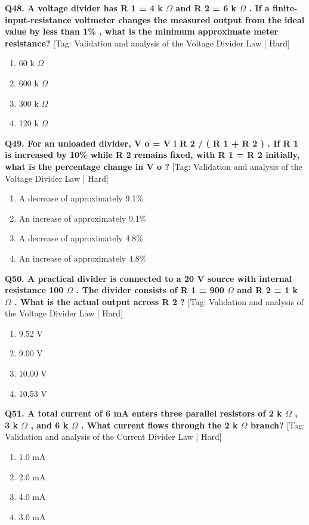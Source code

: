 \noindent\textbf{Q48. A voltage divider has R 1 = 4 k $\Omega$ and R 2 = 6 k $\Omega$ . If a finite-input-resistance voltmeter changes the measured output from the ideal value by less than 1\% , what is the minimum approximate meter resistance?} \hfill [Tag: Validation and analysis of the Voltage Divider Law | Hard]
\begin{enumerate}[label=(\alph*),topsep=2pt,itemsep=1pt,partopsep=0pt,parsep=0pt]
    \item {60 k $\Omega$}
    \item {600 k $\Omega$}
    \item {300 k $\Omega$}
    \item {120 k $\Omega$}
\end{enumerate}
\vspace{2mm}

\noindent\textbf{Q49. For an unloaded divider, V o = V i R 2 / ( R 1 + R 2 ) . If R 1 is increased by 10\% while R 2 remains fixed, with R 1 = R 2 initially, what is the percentage change in V o ?} \hfill [Tag: Validation and analysis of the Voltage Divider Law | Hard]
\begin{enumerate}[label=(\alph*),topsep=2pt,itemsep=1pt,partopsep=0pt,parsep=0pt]
    \item {A decrease of approximately 9.1\%}
    \item {An increase of approximately 9.1\%}
    \item {A decrease of approximately 4.8\%}
    \item {An increase of approximately 4.8\%}
\end{enumerate}
\vspace{2mm}

\noindent\textbf{Q50. A practical divider is connected to a 20 V source with internal resistance 100 $\Omega$ . The divider consists of R 1 = 900 $\Omega$ and R 2 = 1 k $\Omega$ . What is the actual output across R 2 ?} \hfill [Tag: Validation and analysis of the Voltage Divider Law | Hard]
\begin{enumerate}[label=(\alph*),topsep=2pt,itemsep=1pt,partopsep=0pt,parsep=0pt]
    \item {9.52 V}
    \item {9.00 V}
    \item {10.00 V}
    \item {10.53 V}
\end{enumerate}
\vspace{2mm}

\noindent\textbf{Q51. A total current of 6 mA enters three parallel resistors of 2 k $\Omega$ , 3 k $\Omega$ , and 6 k $\Omega$ . What current flows through the 2 k $\Omega$ branch?} \hfill [Tag: Validation and analysis of the Current Divider Law | Hard]
\begin{enumerate}[label=(\alph*),topsep=2pt,itemsep=1pt,partopsep=0pt,parsep=0pt]
    \item {1.0 mA}
    \item {2.0 mA}
    \item {4.0 mA}
    \item {3.0 mA}
\end{enumerate}
\vspace{2mm}

